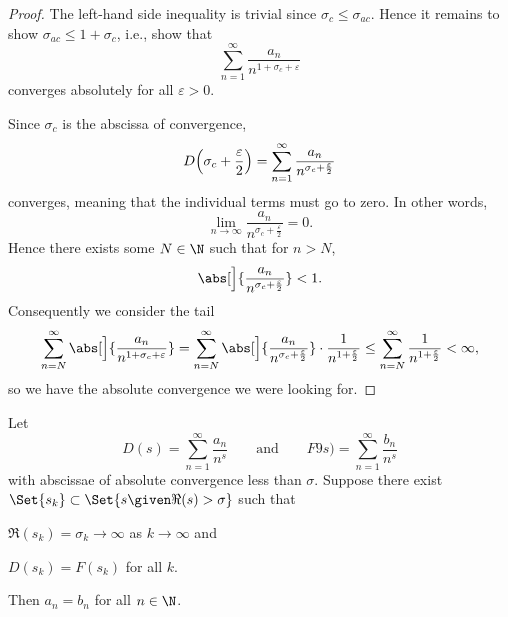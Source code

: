 \begin{proof}
	The left-hand side inequality is trivial since $\sigma_c \leq \sigma_{ac}$.
	Hence it remains to show $\sigma_{ac} \leq 1 + \sigma_c$, i.e., show that
	\[
		\sum_{n = 1}^\infty \frac{a_n}{n^{1 + \sigma_c + \varepsilon}}
	\]
	converges absolutely for all $\varepsilon > 0$.

	Since $\sigma_c$ is the abscissa of convergence,
	\[
		D\Bigl( \sigma_c + \frac{\varepsilon}{2} \Bigr) = \sum_{n = 1}^\infty \frac{a_n}{n^{\sigma_c + \frac{\varepsilon}{2}}}
	\]
	converges, meaning that the individual terms must go to zero.
	In other words,
	\[
		\lim_{n \to \infty} \frac{a_n}{n^{\sigma_c + \frac{\varepsilon}{2}}} = 0.
	\]
	Hence there exists some $N \in \N$ such that for $n > N$,
	\[
		\abs[\Big]{\frac{a_n}{n^{\sigma_c + \frac{\varepsilon}{2}}}} < 1.
	\]
	Consequently we consider the tail
	\[
		\sum_{n = N}^\infty \abs[\Big]{\frac{a_n}{n^{1 + \sigma_c + \varepsilon}}} = \sum_{n = N}^\infty \abs[\Big]{\frac{a_n}{n^{\sigma_c + \frac{\varepsilon}{2}}}} \cdot \frac{1}{n^{1 + \frac{\varepsilon}{2}}} \leq \sum_{n = N}^\infty \frac{1}{n^{1 + \frac{\varepsilon}{2}}} < \infty,
	\]
	so we have the absolute convergence we were looking for.
\end{proof}

\begin{theorem}\label{thm12.4}
	Let
	\[
		D(s) = \sum_{n = 1}^\infty \frac{a_n}{n^s} \qquad \text{and} \qquad F9s) = \sum_{n = 1}^\infty \frac{b_n}{n^s}
	\]
	with abscissae of absolute convergence less than $\sigma$.
	Suppose there exist $\Set{s_k} \subset \Set{s \given \Re(s) > \sigma}$ such that
	\begin{items}
		\item $\Re(s_k) = \sigma_k \to \infty$ as $k \to \infty$ and
		\item $D(s_k) = F(s_k)$ for all $k$.
	\end{items}
	Then $a_n = b_n$ for all $n \in \N$.
\end{theorem}

